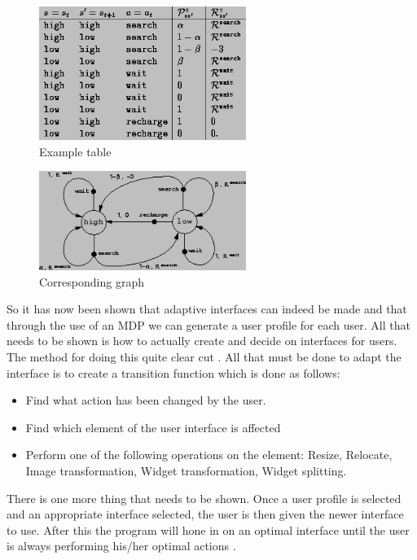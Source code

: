 \documentclass[11pt]{article}
\begin{document}
\begin{figure}[h!]
    \centering
    \includegraphics[width=0.6\textwidth]{1.jpg}
	\caption{Example table}
\end{figure}

\begin{figure}[h!]
	\centering
    \includegraphics[width=0.6\textwidth]{2.jpg}
	\caption{Corresponding graph}
\end{figure}
\vspace{6.0 mm}
\FloatBarrier

\clearpage

So it has now been shown that adaptive interfaces can indeed be made and that through the use of an MDP we can generate a user profile for each user. All that needs to be shown is how to actually create and decide on interfaces for users. The method for doing this quite clear cut \citep{dessart2011showing}. All that must be done to adapt the interface is to create a transition function which is done as follows:
\begin{itemize}
\item Find what action has been changed by the user.
\item Find which element of the user interface is affected
\item Perform one of the following operations on the element: Resize, Relocate, Image transformation, Widget transformation, Widget splitting.
\end{itemize}
\vspace{6.0 mm}

There is one more thing that needs to be shown. Once a user profile is selected and an appropriate interface selected, the user is then given the newer interface to use. After this the program will hone in on an optimal interface until the user is always performing his/her optimal actions \citep{dessart2011showing} \citep{andrade2005challenge}.
\end{document}
